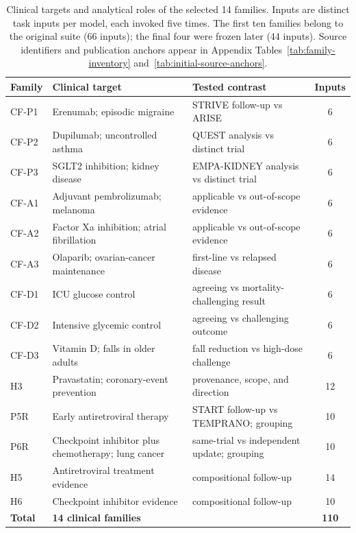 \documentclass[11pt]{article}
\begin{document}
\begin{table}[t]
\centering
\small
\setlength{\tabcolsep}{4pt}
\renewcommand{\arraystretch}{1.08}
\begin{tabularx}{\textwidth}{@{}l >{\raggedright\arraybackslash}X >{\raggedright\arraybackslash}X c@{}}
\toprule
\textbf{Family} & \textbf{Clinical target} & \textbf{Tested contrast} & \textbf{Inputs} \\
\midrule
CF-P1 & Erenumab; episodic migraine & STRIVE follow-up vs ARISE & 6 \\
CF-P2 & Dupilumab; uncontrolled asthma & QUEST analysis vs distinct trial & 6 \\
CF-P3 & SGLT2 inhibition; kidney disease & EMPA-KIDNEY analysis vs distinct trial & 6 \\
CF-A1 & Adjuvant pembrolizumab; melanoma & applicable vs out-of-scope evidence & 6 \\
CF-A2 & Factor Xa inhibition; atrial fibrillation & applicable vs out-of-scope evidence & 6 \\
CF-A3 & Olaparib; ovarian-cancer maintenance & first-line vs relapsed disease & 6 \\
CF-D1 & ICU glucose control & agreeing vs mortality-challenging result & 6 \\
CF-D2 & Intensive glycemic control & agreeing vs challenging outcome & 6 \\
CF-D3 & Vitamin D; falls in older adults & fall reduction vs high-dose challenge & 6 \\
H3 & Pravastatin; coronary-event prevention & provenance, scope, and direction & 12 \\
\midrule
P5R & Early antiretroviral therapy & START follow-up vs TEMPRANO; grouping & 10 \\
P6R & Checkpoint inhibitor plus chemotherapy; lung cancer & same-trial vs independent update; grouping & 10 \\
H5 & Antiretroviral treatment evidence & compositional follow-up & 14 \\
H6 & Checkpoint inhibitor evidence & compositional follow-up & 10 \\
\midrule
\textbf{Total} & \textbf{14 clinical families} & & \textbf{110} \\
\bottomrule
\end{tabularx}
\caption{Clinical targets and analytical roles of the selected 14 families. Inputs are distinct task inputs per model, each invoked five times. The first ten families belong to the original suite (66 inputs); the final four were frozen later (44 inputs). Source identifiers and publication anchors appear in Appendix Tables~\ref{tab:family-inventory} and~\ref{tab:initial-source-anchors}.}
\label{tab:benchmark-overview}
\end{table}
\end{document}
